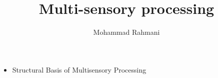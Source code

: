 \documentclass[a4paper]{article}
\title{Multi-sensory processing}
\date{}
\author{Mohammad Rahmani}
\begin{document}
    \maketitle
    
    \begin{itemize}
        \item Structural Basis of Multisensory Processing 
    \end{itemize}
    
    
\end{document}
